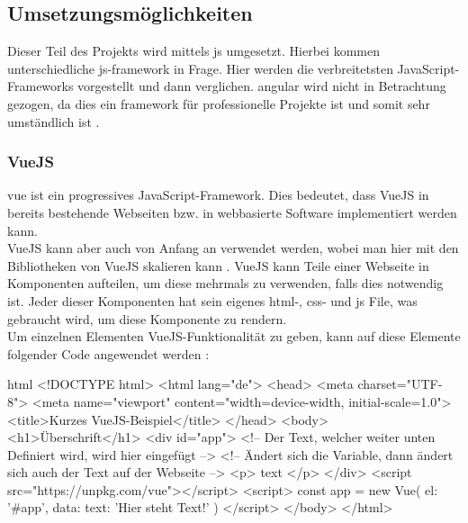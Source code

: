 \subsection{Umsetzungsmöglichkeiten}
Dieser Teil des Projekts wird mittels \Gls{js} umgesetzt. Hierbei kommen unterschiedliche \Gls{js}-\Gls{framework} in Frage. Hier werden die verbreitetsten JavaScript-Frameworks vorgestellt und dann verglichen. \Gls{angular} wird nicht in Betrachtung gezogen, da dies ein \Gls{framework} für professionelle Projekte ist und somit sehr umständlich ist \cite{angular_ex}.
\subsubsection{VueJS}
\gls{vue} ist ein progressives JavaScript-Framework. Dies bedeutet, dass VueJS in bereits bestehende Webseiten bzw. in webbasierte Software implementiert werden kann.\\
VueJS kann aber auch von Anfang an verwendet werden, wobei man hier mit den Bibliotheken von VueJS skalieren kann \cite{vuedoc}. VueJS kann Teile einer Webseite in Komponenten aufteilen, um diese mehrmals zu verwenden, falls dies notwendig ist. Jeder dieser Komponenten hat sein eigenes \Gls{html}-, \Gls{css}- und \Gls{js} File, was gebraucht wird, um diese Komponente zu rendern.\\
Um einzelnen Elementen VueJS-Funktionalität zu geben, kann auf diese Elemente folgender Code angewendet werden \cite{vuedoc}:
\begin{code}{html}
	<!DOCTYPE html>
	<html lang="de">
		<head>
			<meta charset="UTF-8">
			<meta name="viewport" content="width=device-width, initial-scale=1.0">
			<title>Kurzes VueJS-Beispiel</title>
		</head>
		<body>
			<h1>Überschrift</h1>
			<div id="app">
				<!-- Der Text, welcher weiter unten Definiert wird, wird hier eingefügt -->
				<!-- Ändert sich die Variable, dann ändert sich auch der Text auf der Webseite -->
				<p> {{ text }} </p>
			</div>
			<script src="https://unpkg.com/vue"></script>
			<script>
				const app = new Vue({
					el: '#app',
					data: {
						text: 'Hier steht Text!'
					}
				})
			</script>
		</body>
	</html>
\end{code}
